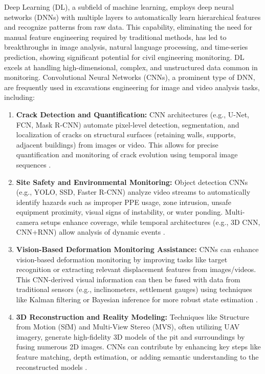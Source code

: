 \documentclass[preprint,11pt,authoryear,3p]{elsarticle}
\begin{document}
Deep Learning (DL), a subfield of machine learning, employs deep neural networks (DNNs) with multiple layers to automatically learn hierarchical features and recognize patterns from raw data. This capability, eliminating the need for manual feature engineering required by traditional methods, has led to breakthroughs in image analysis, natural language processing, and time-series prediction, showing significant potential for civil engineering monitoring. DL excels at handling high-dimensional, complex, and unstructured data common in monitoring. Convolutional Neural Networks (CNNs), a prominent type of DNN, are frequently used in excavations engineering for image and video analysis tasks, including:

\begin{enumerate}
    \item \textbf{Crack Detection and Quantification:} CNN architectures (e.g., U-Net, FCN, Mask R-CNN) automate pixel-level detection, segmentation, and localization of cracks on structural surfaces (retaining walls, supports, adjacent buildings) from images or video. This allows for precise quantification and monitoring of crack evolution using temporal image sequences \citep{https://doi.org/10.1002/stc.2981}.

    \item \textbf{Site Safety and Environmental Monitoring:} Object detection CNNs (e.g., YOLO, SSD, Faster R-CNN) analyze video streams to automatically identify hazards such as improper PPE usage, zone intrusion, unsafe equipment proximity, visual signs of instability, or water ponding. Multi-camera setups enhance coverage, while temporal architectures (e.g., 3D CNN, CNN+RNN) allow analysis of dynamic events \citep{LIU2022104302}.

    \item \textbf{Vision-Based Deformation Monitoring Assistance:} CNNs can enhance vision-based deformation monitoring by improving tasks like target recognition or extracting relevant displacement features from images/videos. This CNN-derived visual information can then be fused with data from traditional sensors (e.g., inclinometers, settlement gauges) using techniques like Kalman filtering or Bayesian inference for more robust state estimation \citep{SHEN2023100442}.

    \item \textbf{3D Reconstruction and Reality Modeling:} Techniques like Structure from Motion (SfM) and Multi-View Stereo (MVS), often utilizing UAV imagery, generate high-fidelity 3D models of the pit and surroundings by fusing numerous 2D images. CNNs can contribute by enhancing key steps like feature matching, depth estimation, or adding semantic understanding to the reconstructed models \citep{WU2021103706, rs14205187}.
\end{enumerate}
\end{document}
